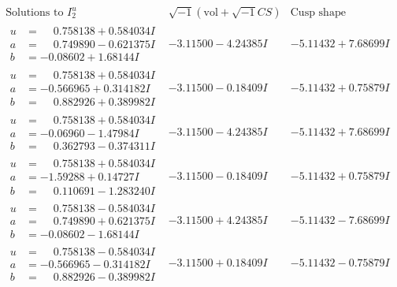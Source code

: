 \documentclass[1p]{elsarticle_modified}
\theoremstyle{definition}
\newcommand{\I}{\sqrt{-1}}
\begin{document}
$$\begin{array}{c|c|c}  
\text{Solutions to }I^u_{2}& \I (\text{vol} + \sqrt{-1}CS) & \text{Cusp shape}\\
 \hline 
\begin{aligned}
u &= \phantom{-}0.758138 + 0.584034 I \\
a &= \phantom{-}0.749890 - 0.621375 I \\
b &= -0.08602 + 1.68144 I\end{aligned}
 & -3.11500 - 4.24385 I & -5.11432 + 7.68699 I \\ \hline\begin{aligned}
u &= \phantom{-}0.758138 + 0.584034 I \\
a &= -0.566965 + 0.314182 I \\
b &= \phantom{-}0.882926 + 0.389982 I\end{aligned}
 & -3.11500 - 0.18409 I & -5.11432 + 0.75879 I \\ \hline\begin{aligned}
u &= \phantom{-}0.758138 + 0.584034 I \\
a &= -0.06960 - 1.47984 I \\
b &= \phantom{-}0.362793 - 0.374311 I\end{aligned}
 & -3.11500 - 4.24385 I & -5.11432 + 7.68699 I \\ \hline\begin{aligned}
u &= \phantom{-}0.758138 + 0.584034 I \\
a &= -1.59288 + 0.14727 I \\
b &= \phantom{-}0.110691 - 1.283240 I\end{aligned}
 & -3.11500 - 0.18409 I & -5.11432 + 0.75879 I \\ \hline\begin{aligned}
u &= \phantom{-}0.758138 - 0.584034 I \\
a &= \phantom{-}0.749890 + 0.621375 I \\
b &= -0.08602 - 1.68144 I\end{aligned}
 & -3.11500 + 4.24385 I & -5.11432 - 7.68699 I \\ \hline\begin{aligned}
u &= \phantom{-}0.758138 - 0.584034 I \\
a &= -0.566965 - 0.314182 I \\
b &= \phantom{-}0.882926 - 0.389982 I\end{aligned}
 & -3.11500 + 0.18409 I & -5.11432 - 0.75879 I \\ \hline\begin{aligned}

\end{aligned}
\end{array}$$
\end{document}

